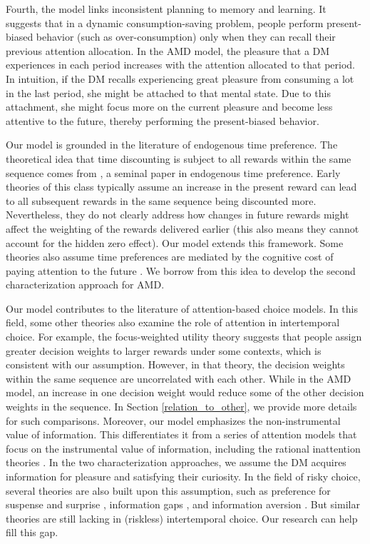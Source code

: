 \documentclass[
  12pt,
]{article}
\begin{document}
Fourth, the model links inconsistent planning to memory and learning. It
suggests that in a dynamic consumption-saving problem, people perform
present-biased behavior (such as over-consumption) only when they can
recall their previous attention allocation. In the AMD model, the
pleasure that a DM experiences in each period increases with the
attention allocated to that period. In intuition, if the DM recalls
experiencing great pleasure from consuming a lot in the last period, she
might be attached to that mental state. Due to this attachment, she
might focus more on the current pleasure and become less attentive to
the future, thereby performing the present-biased behavior.

Our model is grounded in the literature of endogenous time preference.
The theoretical idea that time discounting is subject to all rewards
within the same sequence comes from \citet{uzawa1968time}, a seminal
paper in endogenous time preference. Early theories of this class
\citep{uzawa1968time, epstein1983rate, epstein1983stationary, becker1997endogenous}
typically assume an increase in the present reward can lead to all
subsequent rewards in the same sequence being discounted more.
Nevertheless, they do not clearly address how changes in future rewards
might affect the weighting of the rewards delivered earlier (this also
means they cannot account for the hidden zero effect). Our model extends
this framework. Some theories also assume time preferences are mediated
by the cognitive cost of paying attention to the future
\citep{fudenberg2006dual, noor2022optimal}. We borrow from this idea to
develop the second characterization approach for AMD.

Our model contributes to the literature of attention-based choice
models. In this field, some other theories also examine the role of
attention in intertemporal choice. For example, the focus-weighted
utility theory \citep{kHoszegi2013model} suggests that people assign
greater decision weights to larger rewards under some contexts, which is
consistent with our assumption. However, in that theory, the decision
weights within the same sequence are uncorrelated with each other. While
in the AMD model, an increase in one decision weight would reduce some
of the other decision weights in the sequence. In Section
\ref{relation_to_other}, we provide more details for such comparisons.
Moreover, our model emphasizes the non-instrumental value of
information. This differentiates it from a series of attention models
that focus on the instrumental value of information, including the
rational inattention theories
\citep{sims2003implications, matvejka2015rational, steiner2017rational}.
In the two characterization approaches, we assume the DM acquires
information for pleasure and satisfying their curiosity. In the field of
risky choice, several theories are also built upon this assumption, such
as preference for suspense and surprise \citep{ely2015suspense},
information gaps \citep{golman2018information}, and information aversion
\citep{andries2020information}. But similar theories are still lacking
in (riskless) intertemporal choice. Our research can help fill this gap.
\end{document}
